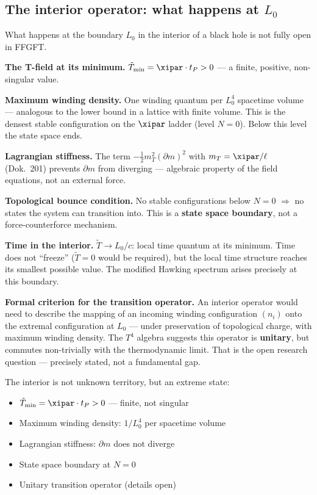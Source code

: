 \subsection{The interior operator: what happens at $L_0$}

What happens at the boundary $L_0$ in the interior of a black hole is not fully open in FFGFT.

\textbf{The T-field at its minimum.}
$\tilde{T}_\text{min} = \xipar \cdot t_P > 0$ --- a finite, positive, non-singular value.

\textbf{Maximum winding density.}
One winding quantum per $L_0^4$ spacetime volume --- analogous to the lower bound in a lattice with finite volume. This is the densest stable configuration on the $\xipar$ ladder (level $N = 0$). Below this level the state space ends.

\textbf{Lagrangian stiffness.}
The term $-\frac{1}{2}m_T^2(\partial m)^2$ with $m_T = \xipar/\ell$ (Dok.~201) prevents $\partial m$ from diverging --- algebraic property of the field equations, not an external force.

\textbf{Topological bounce condition.}
No stable configurations below $N = 0$ $\Rightarrow$ no states the system can transition into. This is a \textbf{state space boundary}, not a force-counterforce mechanism.

\textbf{Time in the interior.}
$\tilde{T} \rightarrow L_0/c$: local time quantum at its minimum. Time does not ``freeze'' ($\tilde{T} = 0$ would be required), but the local time structure reaches its smallest possible value. The modified Hawking spectrum arises precisely at this boundary.

\textbf{Formal criterion for the transition operator.}
An interior operator would need to describe the mapping of an incoming winding configuration $(n_i)$ onto the extremal configuration at $L_0$ --- under preservation of topological charge, with maximum winding density. The $T^4$ algebra suggests this operator is \textbf{unitary}, but commutes non-trivially with the thermodynamic limit. That is the open research question --- precisely stated, not a fundamental gap.

\begin{erkenntnis}
The interior is not unknown territory, but an extreme state:
\begin{itemize}
  \item $\tilde{T}_\text{min} = \xipar \cdot t_P > 0$ --- finite, not singular
  \item Maximum winding density: $1/L_0^4$ per spacetime volume
  \item Lagrangian stiffness: $\partial m$ does not diverge
  \item State space boundary at $N = 0$
  \item Unitary transition operator (details open)
\end{itemize}
\end{erkenntnis}

